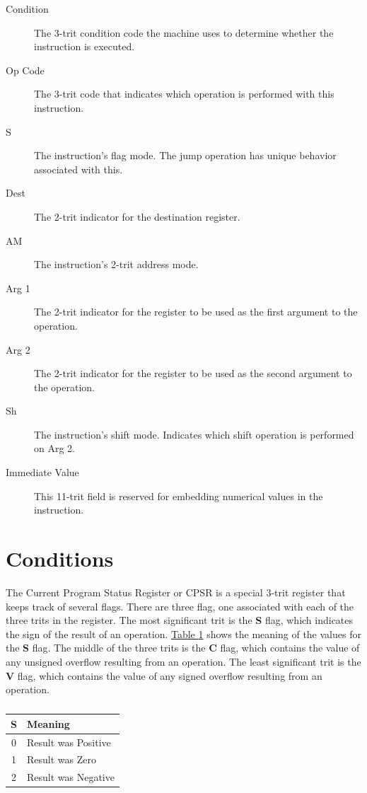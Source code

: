 \documentclass[12pt]{article}
\begin{document}
\begin{description}
\item[Condition] The 3-trit condition code the machine uses to determine whether the instruction is executed.
\item[Op Code] The 3-trit code that indicates which operation is performed with this instruction.
\item[S] The instruction's flag mode. The jump operation has unique behavior associated with this.
\item[Dest] The 2-trit indicator for the destination register.
\item[AM] The instruction's 2-trit address mode.
\item[Arg 1] The 2-trit indicator for the register to be used as the first argument to the operation.
\item[Arg 2] The 2-trit indicator for the register to be used as the second argument to the operation.
\item[Sh] The instruction's shift mode. Indicates which shift operation is performed on Arg 2.
\item[Immediate Value] This 11-trit field is reserved for embedding numerical values in the instruction.
\end{description}
    
\section{Conditions} \label{sec:Conditions}

The Current Program Status Register or CPSR is a special 3-trit register that keeps track of several flags. There are three flag, one associated with each of the three trits in the register. The most significant trit is the \textbf{S} flag, which indicates the sign of the result of an operation. \hyperref[tab:S Values]{Table \ref{tab:S Values}} shows the meaning of the values for the \textbf{S} flag. The middle of the three trits is the \textbf{C} flag, which contains the value of any unsigned overflow resulting from an operation. The least significant trit is the \textbf{V} flag, which contains the value of any signed overflow resulting from an operation.

\begin{table}[h!]
    \centering
    \caption{}
    \label{tab:S Values}
    \begin{tabular}{|c|l|} 
        \hline
        \textbf{S} & Meaning \\ \hline
        0 & Result was Positive \\ \hline
        1 & Result was Zero \\ \hline
        2 & Result was Negative \\ \hline
    \end{tabular}
\end{table}
\end{document}
